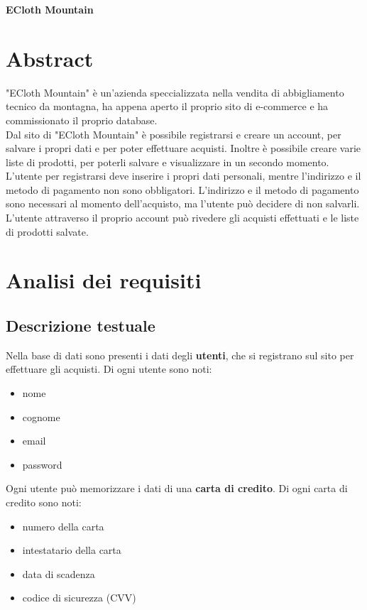 \documentclass[11pt]{article}
\begin{document}
\begin{center}
	\huge{\textbf{ECloth Mountain}}
\end{center}

\section{Abstract}
"ECloth Mountain" è un'azienda speccializzata nella vendita di abbigliamento 
tecnico da montagna, ha appena aperto il proprio sito di e-commerce e ha
commissionato il proprio database. \\
Dal sito di "ECloth Mountain" è possibile registrarsi e creare un account, per
salvare i propri dati e per poter effettuare acquisti. Inoltre è possibile
creare varie liste di prodotti, per poterli salvare e visualizzare in un secondo
momento. \\
L'utente per registrarsi deve inserire i propri dati personali, mentre
l'indirizzo e il metodo di pagamento non sono obbligatori. L'indirizzo e il
metodo di pagamento sono necessari al momento dell'acquisto, ma l'utente può 
decidere di non salvarli. L'utente attraverso il proprio account può rivedere 
gli acquisti effettuati e le liste di prodotti salvate.

\section{Analisi dei requisiti}

\subsection{Descrizione testuale}

Nella base di dati sono presenti i dati degli \textbf{utenti}, che si registrano
sul sito per effettuare gli acquisti. Di ogni utente sono noti: 

\begin{itemize}
	\item nome
	\item cognome
	\item email
	\item password
\end{itemize}

Ogni utente può memorizzare i dati di una \textbf{carta di credito}. Di ogni
carta di credito sono noti:

\begin{itemize}
	\item numero della carta
	\item intestatario della carta
	\item data di scadenza
	\item codice di sicurezza (CVV)
\end{itemize}
\end{document}
